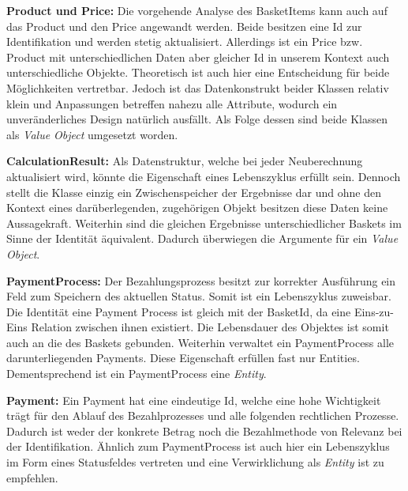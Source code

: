 {	\item \textbf{Product und Price: } {Die vorgehende Analyse des BasketItems kann auch auf das Product und den Price angewandt werden. Beide besitzen eine Id zur Identifikation und werden stetig aktualisiert. Allerdings ist ein Price bzw. Product mit unterschiedlichen Daten aber gleicher Id in unserem Kontext auch unterschiedliche Objekte. Theoretisch ist auch hier eine Entscheidung für beide Möglichkeiten vertretbar. Jedoch ist das Datenkonstrukt beider Klassen relativ klein und Anpassungen betreffen nahezu alle Attribute, wodurch ein unveränderliches Design natürlich ausfällt. Als Folge dessen sind beide Klassen als \emph{Value Object} umgesetzt worden. }
	\item \textbf{CalculationResult: } {Als Datenstruktur, welche bei jeder Neuberechnung aktualisiert wird, könnte die Eigenschaft eines Lebenszyklus erfüllt sein. Dennoch stellt die Klasse einzig ein Zwischenspeicher der Ergebnisse dar und ohne den Kontext eines darüberlegenden, zugehörigen Objekt besitzen diese Daten keine Aussagekraft. Weiterhin sind die gleichen Ergebnisse unterschiedlicher Baskets im Sinne der Identität äquivalent. Dadurch überwiegen die Argumente für ein \emph{Value Object}.}
	\item \textbf{PaymentProcess: } {Der Bezahlungsprozess besitzt zur korrekter Ausführung ein Feld zum Speichern des aktuellen Status. Somit ist ein Lebenszyklus zuweisbar. Die Identität eine Payment Process ist gleich mit der BasketId, da eine Eins-zu-Eins Relation zwischen ihnen existiert. Die Lebensdauer des Objektes ist somit auch an die des Baskets gebunden. Weiterhin verwaltet ein PaymentProcess alle darunterliegenden Payments. Diese Eigenschaft erfüllen fast nur Entities. Dementsprechend ist ein PaymentProcess eine \emph{Entity}.}
	\item \textbf{Payment: } {Ein Payment hat eine eindeutige Id, welche eine hohe Wichtigkeit trägt für den Ablauf des Bezahlprozesses und alle folgenden rechtlichen Prozesse. Dadurch ist weder der konkrete Betrag noch die Bezahlmethode von Relevanz bei der Identifikation. Ähnlich zum PaymentProcess ist auch hier ein Lebenszyklus im Form eines Statusfeldes vertreten und eine Verwirklichung als \emph{Entity} ist zu empfehlen.}
}






